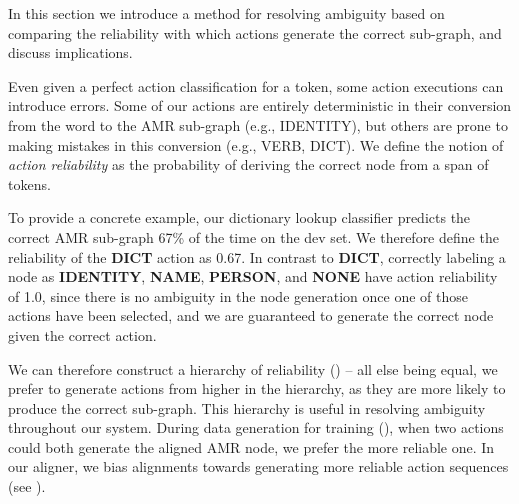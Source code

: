 \documentclass[11pt]{article}
\begin{document}
%
%


In this section we introduce a method for resolving ambiguity based on comparing the reliability with which actions generate the correct sub-graph, and discuss implications.


Even given a perfect action classification for a token, some action executions can introduce errors.
Some of our actions are entirely deterministic in their conversion
  from the word to the AMR sub-graph (e.g., IDENTITY), but others are prone to
  making mistakes in this conversion (e.g., VERB, DICT).
We define the 
  notion of \textit{action reliability} as the probability of deriving the correct node from a span of tokens.

To provide a concrete example, our dictionary lookup classifier predicts the correct
  AMR sub-graph 67\% of the time on the dev set.
We therefore define the reliability of the \textbf{DICT} action as 0.67.
In contrast to \textbf{DICT}, correctly labeling a node as \textbf{IDENTITY}, \textbf{NAME}, \textbf{PERSON}, and \textbf{NONE} have 
  action reliability of 1.0, since there is no ambiguity in the node generation 
  once one of those actions have been selected, 
  and we are guaranteed to generate the correct node given the correct action.

We can therefore construct a hierarchy of reliability () -- all else being equal, we
  prefer to generate actions from higher in the hierarchy, as they are more likely
  to produce the correct sub-graph.
This hierarchy is useful in resolving ambiguity throughout our system. 
During data generation for training (), when two actions could both generate the aligned AMR node, we prefer the more reliable one.
In our aligner, we bias alignments towards generating more reliable action sequences (see ).
\end{document}
